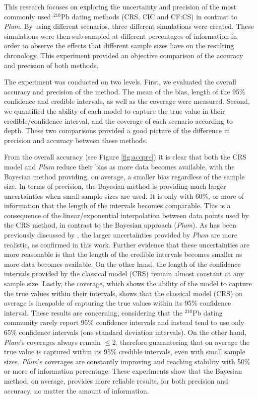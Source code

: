 \documentclass [10pt] {article}
\begin{document}
This research focuses on exploring the uncertainty and precision of the most commonly used $^{210}$Pb dating methods (CRS, CIC and CF:CS) in contrast to \textit{Plum}.
By using different scenarios, three different simulations were created.
These simulations were then sub-sampled at different percentages of information in order to observe the effects that different sample sizes have on the resulting chronology. 
This experiment provided an objective comparison of the accuracy and precision of both methods.

The experiment was conducted on two levels.
First, we evaluated the overall accuracy and precision of the method.
The mean of the bias, length of the 95\% confidence and credible intervals, as well as the coverage were measured.
Second, we quantified the ability of each model to capture the true value in their credible/confidence interval, and the coverage of each scenario according to depth. 
These two comparisons provided a good picture of the difference in precision and accuracy between these methods.

From the overall accuracy (see Figure \ref{fig:accpre}) it is clear that both the CRS model and \textit{Plum} reduce their bias as more data becomes available, with the Bayesian method providing, on average, a smaller bias regardless of the sample size. 
In terms of precision, the Bayesian method is providing much larger uncertainties when small sample sizes are used. 
It is only with 60\%, or more of information that the length of the intervals becomes comparable. 
This is a consequence of the linear/exponential interpolation between data points used by the CRS method, in contrast to the Bayesian approach (\textit{Plum}).  
As has been previously discussed by \citet{Aquino2020}, the larger uncertainties provided by \textit{Plum} are more realistic, as confirmed in this work.
Further evidence that these uncertainties are more reasonable is that the length of the credible intervals becomes smaller as more data becomes available. 
On the other hand, the length of the confidence intervals provided by the classical model (CRS) remain almost constant at any sample size.
Lastly, the coverage, which shows the ability of the model to capture the true values within their intervals, shows that the classical model (CRS) on average is incapable of capturing the true values within its 95\% confidence interval. 
These results are concerning, considering that the $^{210}$Pb dating community rarely report 95\% confidence intervals and instead tend to use only 65\% confidence intervals (one standard deviation intervals).
On the other hand, \textit{Plum}'s coverages always remain $\leq 2$, therefore guaranteeing that on average the true value is captured within its 95\% credible intervals, even with small sample sizes.
\textit{Plum}'s coverages are constantly improving and reaching stability with 50\% or more of information percentage.
These experiments show that the Bayesian method, on average, provides more reliable results, for both precision and accuracy, no matter the amount of information.
\end{document}
